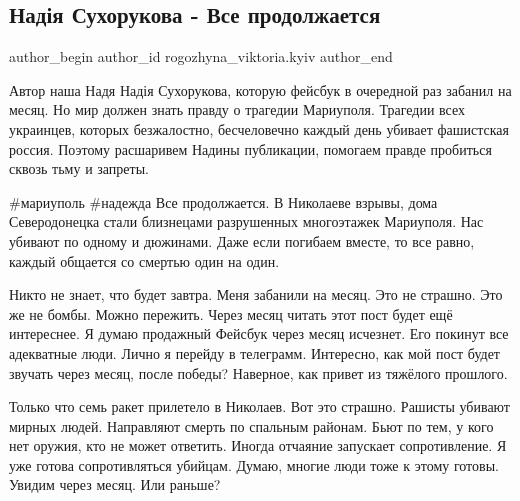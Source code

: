  
 
 
 
 

\subsection{Надія Сухорукова - Все продолжается}
\label{sec:22_06_2022.fb.rogozhyna_viktoria.kyiv.1.nad_ya_sukhorukova__}

\ifcmt
 author_begin
   author_id rogozhyna_viktoria.kyiv
 author_end
\fi

Автор наша Надя Надія Сухорукова, которую фейсбук в очередной раз забанил на
месяц. Но мир должен знать правду о трагедии Мариуполя. Трагедии всех
украинцев, которых безжалостно, бесчеловечно каждый день убивает фашистская
россия. Поэтому расшаривем Надины публикации, помогаем правде пробиться сквозь
тьму и запреты.

\#мариуполь \#надежда Все продолжается. В Николаеве взрывы, дома Северодонецка
стали близнецами разрушенных многоэтажек Мариуполя. Нас убивают   по одному и
дюжинами.  Даже если погибаем вместе, то все равно,  каждый общается со
смертью один на один. 

Никто не знает, что будет завтра. Меня забанили на месяц.  Это не страшно. Это
же не бомбы. Можно пережить. Через месяц читать этот пост будет ещё интереснее.
Я думаю продажный Фейсбук через месяц исчезнет. Его покинут все адекватные
люди. Лично я перейду в телеграмм. Интересно, как мой пост будет звучать через
месяц, после победы? Наверное, как привет из тяжёлого прошлого. 

Только что семь ракет прилетело в Николаев.  Вот это страшно.  Рашисты убивают
мирных людей. Направляют смерть  по спальным районам. Бьют по тем, у кого нет
оружия, кто не может ответить. Иногда отчаяние запускает сопротивление. Я уже
готова сопротивляться убийцам. Думаю, многие люди тоже к этому готовы. Увидим
через месяц.  Или раньше? 

